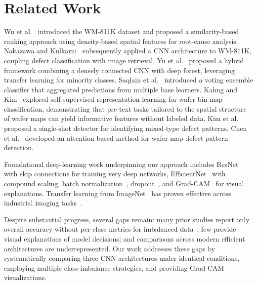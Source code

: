 \documentclass[conference]{IEEEtran}
\begin{document}
\section{Related Work}
\label{sec:related}

Wu et al.~\cite{wu2015} introduced the WM-811K dataset and proposed a
similarity-based ranking approach using density-based spatial features for
root-cause analysis. Nakazawa and Kulkarni~\cite{nakazawa2018} subsequently
applied a CNN architecture to WM-811K, coupling defect classification with
image retrieval. Yu et al.~\cite{yu2019} proposed a hybrid framework
combining a densely connected CNN with deep forest, leveraging transfer
learning for minority classes. Saqlain et al.~\cite{saqlain2020} introduced a
voting ensemble classifier that aggregated predictions from multiple base
learners. Kahng and Kim~\cite{kahng2021} explored self-supervised
representation learning for wafer bin map classification, demonstrating that
pre-text tasks tailored to the spatial structure of wafer maps can yield
informative features without labeled data. Kim et al.~\cite{kim2022} proposed
a single-shot detector for identifying mixed-type defect patterns. Chen et
al.~\cite{chen2023} developed an attention-based method for wafer-map defect
pattern detection.

Foundational deep-learning work underpinning our approach includes
ResNet~\cite{he2016} with skip connections for training very deep networks,
EfficientNet~\cite{tan2019} with compound scaling, batch
normalization~\cite{ioffe2015}, dropout~\cite{srivastava2014}, and
Grad-CAM~\cite{selvaraju2017} for visual explanations. Transfer learning from
ImageNet~\cite{pan2010,yosinski2014} has proven effective across industrial
imaging tasks~\cite{weimer2016}.

Despite substantial progress, several gaps remain: many prior studies report
only overall accuracy without per-class metrics for imbalanced
data~\cite{he2009,chawla2002}; few provide visual explanations of model
decisions; and comparisons across modern efficient architectures are
underrepresented. Our work addresses these gaps by systematically comparing
three CNN architectures under identical conditions, employing multiple
class-imbalance strategies, and providing Grad-CAM visualizations.

\end{document}
